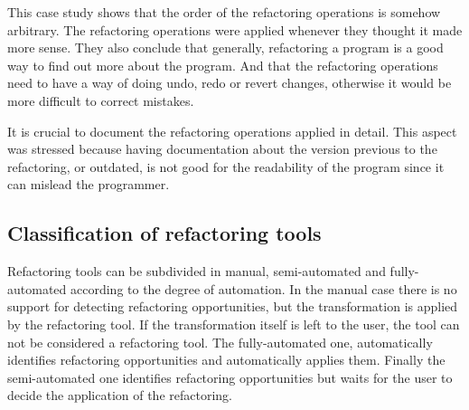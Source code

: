 This case study shows that the order of the refactoring operations is somehow arbitrary.
The refactoring operations were applied whenever they thought it made more sense.
They also conclude that generally, refactoring a program is a good way to find out more about the program.
And that the refactoring operations need to have a way of doing undo, redo or revert changes, otherwise it would be more difficult to correct mistakes.

It is crucial to document the refactoring operations applied in detail.
This aspect was stressed because having documentation about the version previous to the refactoring, or outdated, is not good for the readability of the program since it can mislead the programmer.


\subsection{Classification of refactoring tools} %
Refactoring tools can be subdivided in manual, semi-automated and fully-automa\-ted according to the degree of automation.
In the manual case there is no support for detecting refactoring opportunities, but the transformation is applied by the refactoring tool. If the transformation itself is left to the user, the tool can not be considered a refactoring tool.
The fully-automated one, automatically identifies refactoring opportunities and automatically applies them.
Finally the semi-automated one identifies refactoring opportunities but waits for the user to decide the application of the refactoring.






